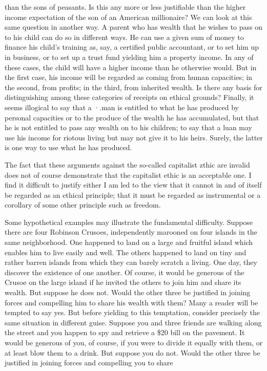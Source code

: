 \documentclass[11pt,openany]{book}
\begin{document}
than the sons of peasants. Is this any more or less justifiable than the higher income expectation of the son of an American millionaire? We can look at this same question in another way. A parent who has wealth that he wishes to pass on to his child can do so in different ways. He can use a given sum of money to finance his child's training as, say, a certified public accountant, or to set him up in business, or to set up a trust fund yielding him a property income. In any of these cases, the child will have a higher income than he otherwise would. But in the first case, his income will be regarded as coming from human capacities; in the second, from profits; in the third, from inherited wealth. Is there any basis for distinguishing among these categories of receipts on ethical grounds? Finally, it seems illogical to say that a ·.man is entitled to what he has produced by personal capacities or to the produce of the wealth he has accumulated, but that he is not entitled to pass any wealth on to his children; to say that a luan may use his income for riotous living but may not give it to his heirs. Surely, the latter is one way to use what he has produced.

The fact that these arguments against the so-called capitalist zthic are invalid does not of course demonstrate that the capitalist ethic is an acceptable one. I find it difficult to justify either I am led to the view that it cannot in and of itself be regarded as an ethical principle; that it must be regarded as instrumental or a corollary of some other principle such as freedom.

Some hypothetical examples may illustrate the fundamental difficulty. Suppose there are four Robinson Crusoes, independently marooned on four islands in the same neighborhood. One happened to land on a large and fruitful island which enables him to live easily and well. The others happened to land on tiny and rather barren islands from which they can barely scratch a living. One day, they discover the existence of one another. Of course, it would be generous of the Crusoe on the large island if he invited the others to join him and share its wealth. But suppose he does not. Would the other three be justified in joining forces and compelling him to share his wealth with them? Many a reader will be tempted to say yes. But before yielding to this temptation, consider precisely the same situation in different guise. Suppose you and three friends are walking along the street and you happen to spy and retrieve a \$20 bill on the pavement. It would be generous of you, of course, if you were to divide it equally with them, or at least blow them to a drink. But suppose you do not. Would the other three be justified in joining forces and compelling you to share
\end{document}
